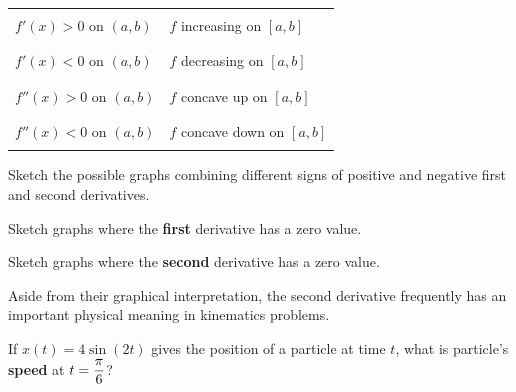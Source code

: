 {\huge
\vsc
\begin{center}
\begin{tabular}{|l|l|} \hline
\qquad \qquad \qquad \qquad \qquad  \qquad \qquad & \qquad  \qquad \qquad \qquad \qquad  \qquad \qquad \\
\qquad $f'(x) > 0 {\mbox{ on }} (a,b)$  &  \qquad $f$ increasing on $[a,b]$  \\
\qquad \qquad \qquad \qquad \qquad & \qquad \qquad \qquad  \qquad \qquad \\
 \hline
\qquad \qquad \qquad \qquad \qquad & \qquad \qquad \qquad  \qquad \qquad \\
\qquad $f'(x) < 0 {\mbox{ on }} (a,b)$  &  \qquad $f$ decreasing on $[a,b]$  \\
\qquad \qquad \qquad \qquad \qquad & \qquad \qquad \qquad  \qquad \qquad \\
 \hline
\qquad \qquad \qquad \qquad \qquad & \qquad \qquad \qquad  \qquad \qquad \\
\qquad $f''(x) > 0 {\mbox{ on }} (a,b)$  &  \qquad $f$ concave up on $[a,b]$  \\ \qquad \qquad \qquad \qquad \qquad & \qquad \qquad \qquad  \qquad \qquad \\
\hline
\qquad \qquad \qquad \qquad \qquad & \qquad \qquad \qquad  \qquad \qquad \\
\qquad $f''(x) < 0 {\mbox{ on }} (a,b)$  &  \qquad $f$ concave down on $[a,b]$ \qquad  \qquad  \\ 
\qquad \qquad \qquad \qquad \qquad & \qquad \qquad \qquad  \qquad \qquad \\
\hline
\end{tabular}
\end{center}
}
\setfont

\newpage 

\problem Sketch the possible graphs combining different signs of
positive and negative first and second derivatives.

\vfill
\vfill


\problem Sketch graphs where the {\bf first} derivative has a zero value. 

\vfill \problem Sketch graphs where the {\bf second} derivative has a
zero value.

\vfill

\newpage

Aside from their graphical interpretation, the second derivative
frequently has an important physical meaning in kinematics problems.

\problem If $x(t) = 4 \sin(2t)$ gives the position of a particle at
time $t$, what is particle's {\bf speed} at $\displaystyle t=\frac{\pi}{6}$?

